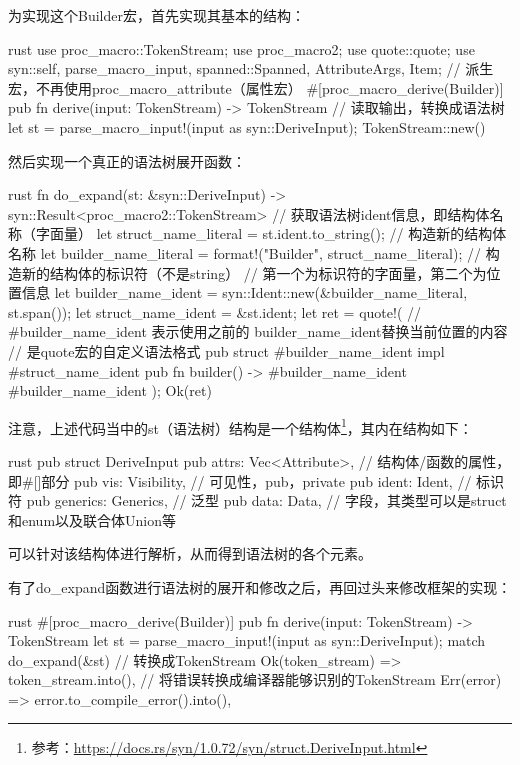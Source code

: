 为实现这个Builder宏，首先实现其基本的结构：
\begin{code-block}{rust}
use proc_macro::TokenStream;
use proc_macro2;
use quote::quote;
use syn::{self, parse_macro_input, spanned::Spanned, AttributeArgs, Item};
// 派生宏，不再使用proc_macro_attribute（属性宏）
#[proc_macro_derive(Builder)]
pub fn derive(input: TokenStream) -> TokenStream {
    // 读取输出，转换成语法树
    let st = parse_macro_input!(input as syn::DeriveInput);
    TokenStream::new()
}
\end{code-block}

然后实现一个真正的语法树展开函数：
\begin{code-block}{rust}
fn do_expand(st: &syn::DeriveInput) -> syn::Result<proc_macro2::TokenStream> {
    // 获取语法树ident信息，即结构体名称（字面量）
    let struct_name_literal = st.ident.to_string();
    // 构造新的结构体名称
    let builder_name_literal = format!("{}Builder", struct_name_literal);
    // 构造新的结构体的标识符（不是string）
    // 第一个为标识符的字面量，第二个为位置信息
    let builder_name_ident = syn::Ident::new(&builder_name_literal, st.span());
    let struct_name_ident = &st.ident;
    let ret = quote!(
        // #builder_name_ident 表示使用之前的 builder_name_ident替换当前位置的内容
        // 是quote宏的自定义语法格式
        pub struct #builder_name_ident {
        }
        impl #struct_name_ident {
            pub fn builder() -> #builder_name_ident {
                #builder_name_ident {
                }
            }
        }
    );
    Ok(ret)
}
\end{code-block}
注意，上述代码当中的st（语法树）结构是一个结构体\footnote{参考：\url{https://docs.rs/syn/1.0.72/syn/struct.DeriveInput.html}}，其内在结构如下：
\begin{code-block}{rust}
pub struct DeriveInput {
    pub attrs: Vec<Attribute>, // 结构体/函数的属性，即#[]部分
    pub vis: Visibility,       // 可见性，pub，private
    pub ident: Ident,          // 标识符
    pub generics: Generics,    // 泛型
    pub data: Data,            // 字段，其类型可以是struct和enum以及联合体Union等
}
\end{code-block}
可以针对该结构体进行解析，从而得到语法树的各个元素。

有了do\_expand函数进行语法树的展开和修改之后，再回过头来修改框架的实现：
\begin{code-block}{rust}
#[proc_macro_derive(Builder)]
pub fn derive(input: TokenStream) -> TokenStream {
    let st = parse_macro_input!(input as syn::DeriveInput);
    match do_expand(&st) {
        // 转换成TokenStream
        Ok(token_stream) => token_stream.into(),
        // 将错误转换成编译器能够识别的TokenStream
        Err(error) => error.to_compile_error().into(),
    }
}
\end{code-block}


